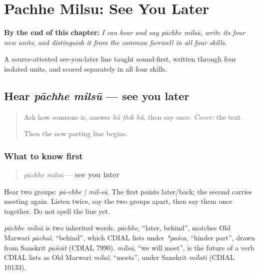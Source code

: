 
\chapter{Pachhe Milsu: See You Later}
\label{ch:mw-see-you-later}

\begin{chapteropening}
\textbf{By the end of this chapter:} \emph{I can hear and say pāchhe milsū, write its four new units, and distinguish it from the common farewell    in all four skills.}

A source-attested see-you-later line taught sound-first, written through four isolated units, and scored separately in all four skills.
\end{chapteropening}

\section[pāchhe milsū]{Hear \emph{pāchhe milsū} — see you later}

\label{lesson:MW-C07-hear-later}



\begin{quote}
Ask how someone is, answer \emph{hū̃ ṭhīk hū̃}, then say \textbf{  } once. \emph{Cover:} the text

Then the new parting line begins.
\end{quote}

\subsection*{What to know first}
\begin{quote}
\emph{pāchhe milsū} — \textbf{see you later}
\end{quote}

Hear two groups: \emph{pā-chhe | mil-sū}. The first points later/back; the second carries meeting again. Listen twice, say the two groups apart, then say them once together. Do not spell the line yet.

\begin{cousinweb}
\emph{pāchhe milsū} is two inherited words. \emph{pāchhe}, \textquotedblleft{}later, behind\textquotedblright{}, matches Old Marwari \emph{pāchaï}, \textquotedblleft{}behind\textquotedblright{}, which CDIAL lists under \emph{*paśca}, \textquotedblleft{}hinder part\textquotedblright{}, drawn from Sanskrit \emph{paścāt} (CDIAL 7990). \emph{milsū}, \textquotedblleft{}we will meet\textquotedblright{}, is the future of a verb CDIAL lists as Old Marwari \emph{milaï}, \textquotedblleft{}meets\textquotedblright{}, under Sanskrit \emph{milati} (CDIAL 10133).
\end{cousinweb}

